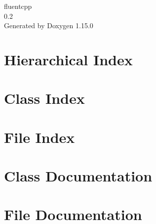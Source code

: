 \documentclass[twoside]{book}
\newcommand{\+}{\discretionary{\mbox{\scriptsize$\hookleftarrow$}}{}{}}
\newcommand{\clearemptydoublepage}{%
    \newpage{\pagestyle{empty}\cleardoublepage}%
  }
\begin{document}
  \raggedbottom
    \hypersetup{pageanchor=false,
                bookmarksnumbered=true,
                pdfencoding=unicode
               }
  \begin{titlepage}
  \vspace*{7cm}
  \begin{center}%
  {\Large fluentcpp}\\
  [1ex]\large 0.\+2 \\
  \vspace*{1cm}
  {\large Generated by Doxygen 1.15.0}\\
  \end{center}
  \end{titlepage}
  \clearemptydoublepage
  \tableofcontents
  \clearemptydoublepage
  \hypersetup{pageanchor=true}

\chapter{Hierarchical Index}

\chapter{Class Index}

\chapter{File Index}

\chapter{Class Documentation}











\chapter{File Documentation}








  \backmatter
  \newpage
  \clearemptydoublepage
  \printindex
\end{document}
